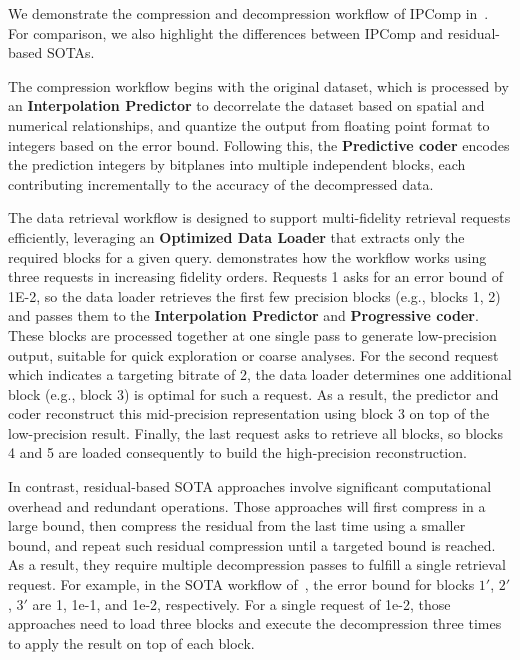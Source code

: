 We demonstrate the compression and decompression workflow of IPComp in~. For comparison, we also highlight the differences between IPComp and residual-based SOTAs.

The compression workflow begins with the original dataset, which is processed by an \textbf{Interpolation Predictor} to decorrelate the dataset based on spatial and numerical relationships, and quantize the output from floating point format to integers based on the error bound. Following this, the \textbf{Predictive coder} encodes the prediction integers by bitplanes into multiple independent blocks, each contributing incrementally to the accuracy of the decompressed data. 

The data retrieval workflow is designed to support multi-fidelity retrieval requests efficiently, leveraging an \textbf{Optimized Data Loader} that extracts only the required blocks for a given query.  demonstrates how the workflow works using three requests in increasing fidelity orders. Requests 1 asks for an error bound of 1E-2, so the data loader retrieves the first few precision blocks (e.g., blocks 1, 2) and passes them to the \textbf{Interpolation Predictor} and \textbf{Progressive coder}. These blocks are processed together at one single pass to generate low-precision output, suitable for quick exploration or coarse analyses. For the second request which indicates a targeting bitrate of 2, the data loader determines one additional block (e.g., block 3) is optimal for such a request. As a result, the predictor and coder reconstruct this mid-precision representation using block 3 on top of the low-precision result. Finally, the last request asks to retrieve all blocks, so blocks 4 and 5 are loaded consequently to build the high-precision reconstruction. 

In contrast, residual-based SOTA approaches involve significant computational overhead and redundant operations. Those approaches will first compress in a large bound, then compress the residual from the last time using a smaller bound, and repeat such residual compression until a targeted bound is reached. As a result, they require multiple decompression passes to fulfill a single retrieval request. For example, in the SOTA workflow of~, the error bound for blocks $1'$, $2'$, $3'$ are 1, 1e-1, and 1e-2, respectively. For a single request of 1e-2, those approaches need to load three blocks and execute the decompression three times to apply the result on top of each block.


